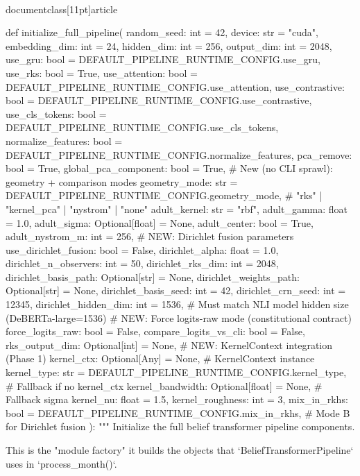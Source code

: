 \\documentclass[11pt]{article}
\begin{document}
\begin{CodeBlock}
def initialize_full_pipeline(
    random_seed: int = 42,
    device: str = "cuda",
    embedding_dim: int = 24,
    hidden_dim: int = 256,
    output_dim: int = 2048,
    use_gru: bool = DEFAULT_PIPELINE_RUNTIME_CONFIG.use_gru,
    use_rks: bool = True,
    use_attention: bool = DEFAULT_PIPELINE_RUNTIME_CONFIG.use_attention,
    use_contrastive: bool = DEFAULT_PIPELINE_RUNTIME_CONFIG.use_contrastive,
    use_cls_tokens: bool = DEFAULT_PIPELINE_RUNTIME_CONFIG.use_cls_tokens,
    normalize_features: bool = DEFAULT_PIPELINE_RUNTIME_CONFIG.normalize_features,
    pca_remove: bool = True,
    global_pca_component: bool = True,
    # New (no CLI sprawl): geometry + comparison modes
    geometry_mode: str = DEFAULT_PIPELINE_RUNTIME_CONFIG.geometry_mode,  # "rks" | "kernel_pca" | "nystrom" | "none"
    adult_kernel: str = "rbf",
    adult_gamma: float = 1.0,
    adult_sigma: Optional[float] = None,
    adult_center: bool = True,
    adult_nystrom_m: int = 256,
    # NEW: Dirichlet fusion parameters
    use_dirichlet_fusion: bool = False,
    dirichlet_alpha: float = 1.0,
    dirichlet_n_observers: int = 50,
    dirichlet_rks_dim: int = 2048,
    dirichlet_basis_path: Optional[str] = None,
    dirichlet_weights_path: Optional[str] = None,
    dirichlet_basis_seed: int = 42,
    dirichlet_crn_seed: int = 12345,
    dirichlet_hidden_dim: int = 1536,  # Must match NLI model hidden size (DeBERTa-large=1536)
    # NEW: Force logits-raw mode (constitutional contract)
    force_logits_raw: bool = False,
    compare_logits_vs_cli: bool = False,
    rks_output_dim: Optional[int] = None,
    # NEW: KernelContext integration (Phase 1)
    kernel_ctx: Optional[Any] = None,  # KernelContext instance
    kernel_type: str = DEFAULT_PIPELINE_RUNTIME_CONFIG.kernel_type,          # Fallback if no kernel_ctx
    kernel_bandwidth: Optional[float] = None,  # Fallback sigma
    kernel_nu: float = 1.5,
    kernel_roughness: int = 3,
    mix_in_rkhs: bool = DEFAULT_PIPELINE_RUNTIME_CONFIG.mix_in_rkhs,         # Mode B for Dirichlet fusion
):
    """
    Initialize the full belief transformer pipeline components.

    This is the "module factory"  it builds the objects that `BeliefTransformerPipeline`
    uses in `process_month()`.


\end{CodeBlock}
\end{document}
